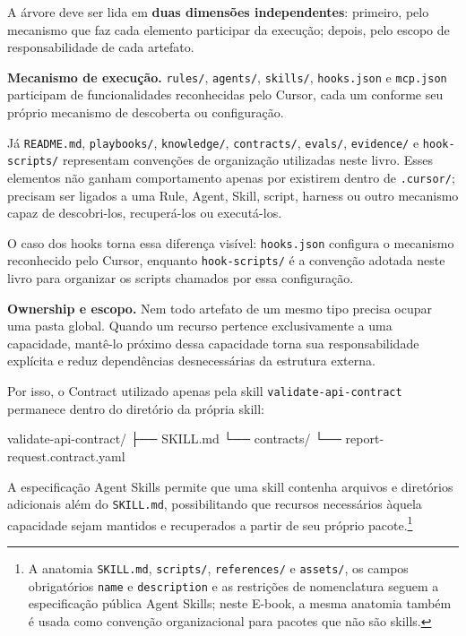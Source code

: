 \documentclass[
  10pt,
  a4paper,
  oneside]{book}
\newenvironment{Shaded}{}{}
\newcommand{\NormalTok}[1]{#1}
\renewenvironment{Shaded}{\begin{snugshade}}{\end{snugshade}}%
\begin{document}
A árvore deve ser lida em \textbf{duas dimensões independentes}:
primeiro, pelo mecanismo que faz cada elemento participar da execução;
depois, pelo escopo de responsabilidade de cada artefato.

\textbf{Mecanismo de execução.} \texttt{rules/}, \texttt{agents/},
\texttt{skills/}, \texttt{hooks.json} e \texttt{mcp.json} participam de
funcionalidades reconhecidas pelo Cursor, cada um conforme seu próprio
mecanismo de descoberta ou configuração.

Já \texttt{README.md}, \texttt{playbooks/}, \texttt{knowledge/},
\texttt{contracts/}, \texttt{evals/}, \texttt{evidence/} e
\texttt{hook-scripts/} representam convenções de organização utilizadas
neste livro. Esses elementos não ganham comportamento apenas por
existirem dentro de \texttt{.cursor/}; precisam ser ligados a uma Rule,
Agent, Skill, script, harness ou outro mecanismo capaz de descobri-los,
recuperá-los ou executá-los.

O caso dos hooks torna essa diferença visível: \texttt{hooks.json}
configura o mecanismo reconhecido pelo Cursor, enquanto
\texttt{hook-scripts/} é a convenção adotada neste livro para organizar
os scripts chamados por essa configuração.

\textbf{Ownership e escopo.} Nem todo artefato de um mesmo tipo precisa
ocupar uma pasta global. Quando um recurso pertence exclusivamente a uma
capacidade, mantê-lo próximo dessa capacidade torna sua responsabilidade
explícita e reduz dependências desnecessárias da estrutura externa.

Por isso, o Contract utilizado apenas pela skill
\texttt{validate-api-contract} permanece dentro do diretório da própria
skill:

\begin{Shaded}
\begin{Highlighting}[]
\NormalTok{validate{-}api{-}contract/}
\NormalTok{├── SKILL.md}
\NormalTok{└── contracts/}
\NormalTok{    └── report{-}request.contract.yaml}
\end{Highlighting}
\end{Shaded}

A especificação Agent Skills permite que uma skill contenha arquivos e
diretórios adicionais além do \texttt{SKILL.md}, possibilitando que
recursos necessários àquela capacidade sejam mantidos e recuperados a
partir de seu próprio pacote.\footnote{A anatomia \texttt{SKILL.md},
  \texttt{scripts/}, \texttt{references/} e \texttt{assets/}, os campos
  obrigatórios \texttt{name} e \texttt{description} e as restrições de
  nomenclatura seguem a especificação pública Agent Skills; neste
  E-book, a mesma anatomia também é usada como convenção organizacional
  para pacotes que não são skills.}
\end{document}

